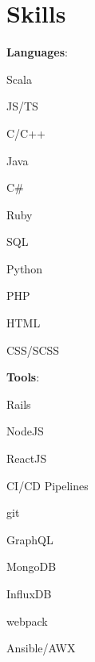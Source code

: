 \documentclass{resume}
\begin{document}
	\section{Skills}%
	\setlength{\columnsep}{1pc}%
	\setlength{\multicolsep}{0pt}%
	\begin{multicols}{3}%
		\textbf{Languages}:
		\begin{multicols}{2}
			\begin{loneinnerlist}
				\item Scala
				\item JS/TS %
				\item C/C++
				\item Java
				\item C\#
				\item Ruby
				\item SQL
				\item Python
				\item PHP
				\item HTML
				\item CSS/SCSS
			\end{loneinnerlist}
		\end{multicols}
		\columnbreak
		\textbf{Tools}:
		\begin{multicols}{2}
			\begin{loneinnerlist}
				\item Rails
				\item NodeJS
				\item ReactJS
				\item CI/CD Pipelines
				\item git
				\item GraphQL
				\item MongoDB
				\item InfluxDB
				\item webpack
				\item Ansible/AWX

\end{loneinnerlist}
\end{multicols}
\end{multicols}
\end{document}
